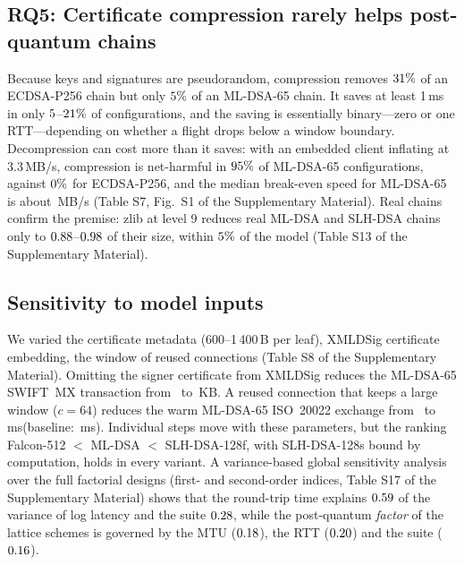 \documentclass[preprint,12pt]{elsarticle}
\newcommand{\ms}{\,ms\xspace}
\newcommand{\KB}{\,KB\xspace}
\newcommand{\supp}[1]{#1 of the Supplementary Material}
\begin{document}
\subsection{RQ5: Certificate compression rarely helps post-quantum chains}
Because keys and signatures are pseudorandom, compression removes $31\%$ of an ECDSA-P256 chain but only $5\%$ of an ML-DSA-65 chain. It saves at least 1\ms in only $5$--$21\%$ of configurations, and the saving is essentially binary---zero or one RTT---depending on whether a flight drops below a window boundary. Decompression can cost more than it saves: with an embedded client inflating at 3.3\,MB/s, compression is net-harmful in $95\%$ of ML-DSA-65 configurations, against $0\%$ for ECDSA-P256, and the median break-even speed for ML-DSA-65 is about \beMLmbs\,MB/s (\supp{Table S7, Fig.~S1}). Real chains confirm the premise: zlib at level 9 reduces real ML-DSA and SLH-DSA chains only to $0.88$--$0.98$ of their size, within $5\%$ of the model (\supp{Table S13}).


\subsection{Sensitivity to model inputs}
\label{sec:sens}
We varied the certificate metadata (600--1\,400\,B per leaf), XMLDSig certificate embedding, the window of reused connections (\supp{Table S8}). Omitting the signer certificate from XMLDSig reduces the ML-DSA-65 SWIFT~MX transaction from \swiftKBMLDSAsixtyfive\ to \nocertMLKB\KB. A reused connection that keeps a large window ($c=64$) reduces the warm ML-DSA-65 ISO~20022 exchange from \idleWarmML\ to \busyWarmML\ms (baseline: \busyWarmBase\ms). Individual steps move with these parameters, but the ranking Falcon-512 $<$ ML-DSA $<$ SLH-DSA-128f, with SLH-DSA-128s bound by computation, holds in every variant. A variance-based global sensitivity analysis over the full factorial designs (first- and second-order indices, \supp{Table S17}) shows that the round-trip time explains $0.59$ of the variance of log latency and the suite $0.28$, while the post-quantum \emph{factor} of the lattice schemes is governed by the MTU ($0.18$), the RTT ($0.20$) and the suite ($0.16$).
\end{document}

